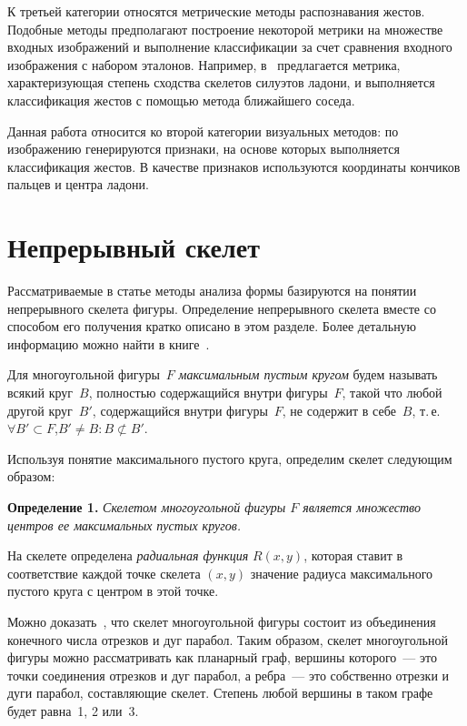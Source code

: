 \begin{multicols}{2}
К третьей категории относятся метрические методы распознавания жестов.
Подобные методы предполагают построение некоторой метрики на множестве 
входных изображений и выполнение классификации за счет сравнения входного 
изображения с набором эталонов.
Например, в~\cite{StableSkeletonization2010} предлагается метрика, 
характеризующая степень сходства скелетов силуэтов ладони, и выполняется 
классификация жестов с помощью метода ближайшего соседа.

Данная работа относится ко второй категории визуальных методов: по изображению 
генерируются признаки, на основе которых выполняется классификация жестов.
В качестве признаков используются координаты кончиков пальцев и центра ладони.

\section{Непрерывный скелет}\label{sec:ContinuousSkeleton}

Рассматриваемые в статье методы анализа формы базируются на понятии непрерывного скелета фигуры.
Определение непрерывного скелета вмес\-те со способом его получения кратко описано в этом разделе.
Более детальную информацию можно найти в книге~\cite{MestSkeletonBook}.

Для многоугольной фигуры~$F$ \textit{максимальным пус\-тым кругом} будем называть всякий круг~$B$,
полностью содержащийся внутри фигуры~$F$, такой что любой другой круг~$B'$, содержащийся 
внут\-ри фигуры~$F$, не содержит в себе~$B$, т.\,е.\ 
$\forall B' \subset F$,\linebreak $B' \not= B : B \not\subset B'$.

Используя понятие максимального пустого круга, определим скелет следующим образом:

\medskip

\noindent
\textbf{Определение 1.} %
\textit{Скелетом многоугольной фигуры $F$ является множество центров ее 
максимальных пус\-тых кругов.}

\smallskip

На скелете определена \textit{радиальная функция} $R(x,y)$, которая 
ставит в соответствие каждой точке скелета $(x,y)$ значение радиуса 
максимального пустого круга с центром в этой точке.

Можно доказать~\cite{MestetskiySkeletonBezierCurves}, что скелет 
многоугольной фигуры состоит из объединения конечного числа отрезков и дуг парабол.
Таким образом, скелет многоугольной фигуры можно рассматривать как 
планарный граф, вершины которого~--- это точки соединения отрезков и дуг парабол, а ребра~--- 
это собственно отрезки и дуги парабол, составляющие скелет.
Степень любой вершины в таком графе будет рав\-на~1, 2 или~3.


\end{multicols}
